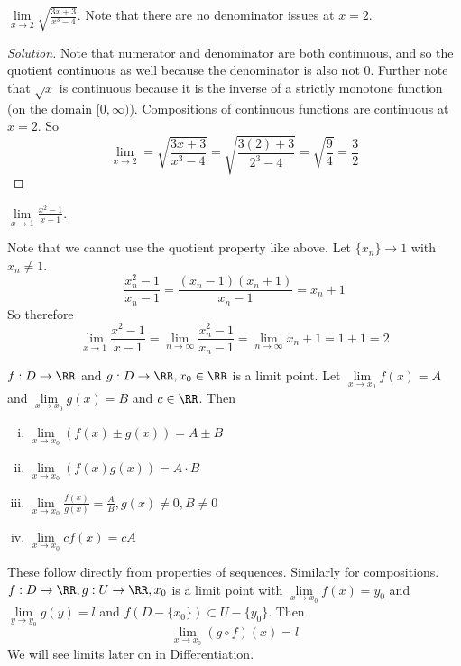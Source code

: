 \documentclass[12pt]{scrartcl}
\begin{document}
\begin{example}
  $\underset{x \to 2}{\lim}\sqrt{\frac{3x + 3}{x^3 - 4}}$. Note that there are no 
  denominator issues at $x = 2$. 

  \begin{proof}[Solution]
    Note that numerator and denominator are both continuous, and so the 
    quotient continuous as well because the denominator is also not $0$. 
    Further note that $\sqrt{x}$ is continuous because it is the inverse 
    of a strictly monotone function (on the domain $[0, \infty)$). Compositions of continuous functions 
    are continuous at $x=2$. So 
    \[\lim_{x\to2} = \sqrt{\frac{3x+3}{x^3-4}} = \sqrt{\frac{3(2) + 3}{2^3-4}} = \sqrt{\frac{9}{4}} = \frac{3}{2}\]
  \end{proof}
\end{example}

\begin{example}
  $\underset{x\to1}{\lim}\frac{x^2-1}{x-1}$. 

  Note that we cannot use the quotient property like above. Let $\{x_n\} \to 1$ with 
  $x_n \neq 1$. 
  \[\frac{x_n^2 - 1}{x_n - 1} = \frac{(x_n-1)(x_n+1)}{x_n-1} = x_n + 1\]
  So therefore
  \[\lim_{x\to1} \frac{x^2-1}{x-1} = \lim_{n\to\infty}\frac{x_n^2-1}{x_n-1} = \lim_{n\to\infty}x_n + 1 = 1 + 1 = 2\]
\end{example}

\begin{theorem}
  $f: D \to \RR$ and $g: D \to \RR, x_0 \in\RR$ is a limit point. 
  Let $\underset{x\to x_0}{\lim}f(x) = A$ and $\underset{x\to x_0}{\lim}g(x) = B$
  and $c \in \RR$. Then 
  \begin{enumerate}[i.]
    \item $\underset{x\to x_0}{\lim}(f(x) \pm g(x)) = A \pm B$
    \item $\underset{x\to x_0}{\lim}(f(x)g(x)) = A \cdot B$
    \item $\underset{x\to x_0}{\lim}\frac{f(x)}{g(x)} = \frac{A}{B}, g(x) \neq 0, B \neq 0$
    \item $\underset{x\to x_0}{\lim}cf(x) = cA$
  \end{enumerate}
  These follow directly from properties of sequences. Similarly for compositions.
  $f: D \to \RR, g: U \to \RR, x_0$ is a limit point with $\underset{x\to x_0}{\lim}f(x) = y_0$
  and $\underset{y\to y_0}{\lim}g(y) = l$ and $f(D - \{x_0\}) \subset U - \{y_0\}$. 
  Then
  \[\lim_{x\to x_0} (g \circ f)(x) = l\]
  We will see limits later on in Differentiation.
\end{theorem}
\end{document}
